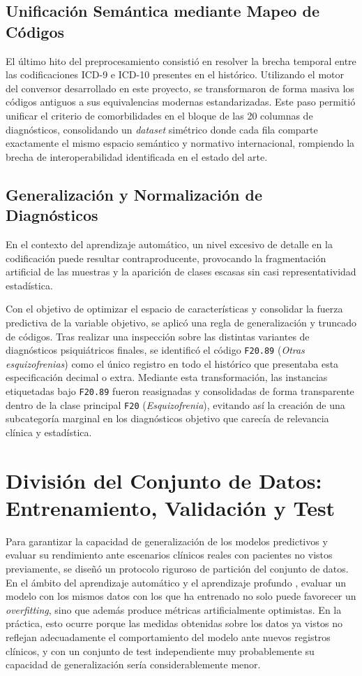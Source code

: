 \documentclass[12pt,a4paper,onecolumn,oneside]{report}
\begin{document}
\subsection{Unificación Semántica mediante Mapeo de Códigos}
El último hito del preprocesamiento consistió en resolver la brecha temporal entre las codificaciones ICD-9 e ICD-10 presentes en el histórico. Utilizando el motor del conversor desarrollado en este proyecto, se transformaron de forma masiva los códigos antiguos a sus equivalencias modernas estandarizadas. Este paso permitió unificar el criterio de comorbilidades en el bloque de las 20 columnas de diagnósticos, consolidando un \textit{dataset} simétrico donde cada fila comparte exactamente el mismo espacio semántico y normativo internacional, rompiendo la brecha de interoperabilidad identificada en el estado del arte.

\subsection{Generalización y Normalización de Diagnósticos}

En el contexto del aprendizaje automático, un nivel excesivo de detalle en la codificación puede resultar contraproducente, provocando la fragmentación artificial de las muestras y la aparición de clases escasas sin casi representatividad estadística.

Con el objetivo de optimizar el espacio de características y consolidar la fuerza predictiva de la variable objetivo, se aplicó una regla de generalización y truncado de códigos. Tras realizar una inspección sobre las distintas variantes de diagnósticos psiquiátricos finales, se identificó el código \texttt{F20.89} (\textit{Otras esquizofrenias}) como el único registro en todo el histórico que presentaba esta especificación decimal o extra. Mediante esta transformación, las instancias etiquetadas bajo \texttt{F20.89} fueron reasignadas y consolidadas de forma transparente dentro de la clase principal \texttt{F20} (\textit{Esquizofrenia}), evitando así la creación de una subcategoría marginal en los diagnósticos objetivo que carecía de relevancia clínica y estadística.

\section{División del Conjunto de Datos: Entrenamiento, Validación y Test}

Para garantizar la capacidad de generalización de los modelos predictivos y evaluar su rendimiento ante escenarios clínicos reales con pacientes no vistos previamente, se diseñó un protocolo riguroso de partición del conjunto de datos. En el ámbito del aprendizaje automático  y el aprendizaje profundo , evaluar un modelo con los mismos datos con los que ha entrenado no solo puede favorecer un \textit{overfitting}, sino que además produce métricas artificialmente optimistas. En la práctica, esto ocurre porque las medidas obtenidas sobre los datos ya vistos no reflejan adecuadamente el comportamiento del modelo ante nuevos registros clínicos, y con un conjunto de test independiente muy probablemente su capacidad de generalización sería considerablemente menor.
\end{document}

